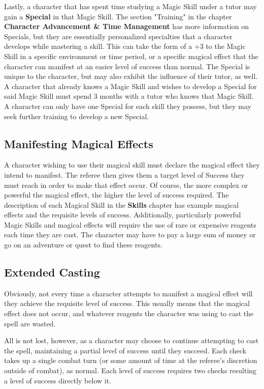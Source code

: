 \documentclass[oneside]{book}
\begin{document}
\begin{multicols}{2}
Lastly, a character that has spent time studying a Magic Skill under a tutor may gain a \textbf{Special} in that Magic Skill. The section "Training" in the chapter \textbf{Character Advancement \& Time Management} has more information on Specials, but they are essentially personalized specialties that a character develops while mastering a skill. This can take the form of a +3 to the Magic Skill in a specific environment or time period, or a specific magical effect that the character can manifest at an easier level of success than normal. The Special is unique to the character, but may also exhibit the influence of their tutor, as well. A character that already knows a Magic Skill and wishes to develop a Special for said Magic Skill must spend 3 months with a tutor who knows that Magic Skill. A character can only have one Special for each skill they possess, but they may seek further training to develop a new Special.

\subsection{Manifesting Magical Effects}
A character wishing to use their magical skill must declare the magical effect they intend to manifest. The referee then gives them a target level of Success they must reach in order to make that effect occur. Of course, the more complex or powerful the magical effect, the higher the level of success required. The description of each Magical Skill in the \textbf{Skills} chapter has example magical effects and the requisite levels of success. Additionally, particularly powerful Magic Skills and magical effects will require the use of rare or expensive reagents each time they are cast. The character may have to pay a large sum of money or go on an adventure or quest to find these reagents.

\subsection{Extended Casting}
Obviously, not every time a character attempts to manifest a magical effect will they achieve the requisite level of success. This usually means that the magical effect does not occur, and whatever reagents the character was using to cast the spell are wasted. 

All is not lost, however, as a character may choose to continue attempting to cast the spell, maintaining a partial level of success until they succeed. Each check takes up a single combat turn (or some amount of time at the referee's discretion outside of combat), as normal. Each level of success requires two checks resulting a level of success directly below it. 


\end{multicols}
\end{document}
